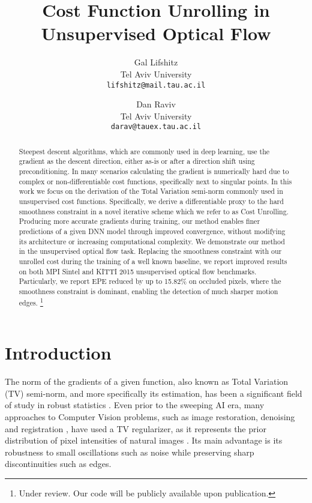 \documentclass[10pt,twocolumn,letterpaper]{article}
\begin{document}
\title{Cost Function Unrolling in Unsupervised Optical Flow}

\author{Gal Lifshitz\\
Tel Aviv University\\
{\tt\small lifshitz@mail.tau.ac.il}
\and
Dan Raviv\\
Tel Aviv University\\
{\tt\small darav@tauex.tau.ac.il}
}
\maketitle

\begin{abstract}

Steepest descent algorithms, which are commonly used in deep learning, use the gradient as the descent direction, either as-is or after a direction shift using preconditioning. 
In many scenarios calculating the gradient is numerically hard due to complex or non-differentiable cost functions, specifically next to singular points. 
In this work we focus on the derivation of the Total Variation semi-norm commonly used in unsupervised cost functions.
Specifically, we derive a differentiable proxy to the hard  smoothness constraint in a novel iterative scheme which we refer to as Cost Unrolling.
Producing more accurate gradients during training, our method enables finer predictions of a given DNN model through improved convergence, without modifying its architecture or increasing computational complexity.
We demonstrate our method in the unsupervised optical flow task. Replacing the  smoothness constraint with our unrolled cost during the training of a well known baseline, we report improved results on both MPI Sintel and KITTI 2015 unsupervised optical flow benchmarks.
Particularly, we report EPE reduced by up to 15.82\% on occluded pixels, where the smoothness constraint is dominant, enabling the detection of much sharper motion edges.
\footnote{Under review. Our code will be publicly available upon publication.}






\end{abstract}

 \section{Introduction}

The  norm of the gradients of a given function, also known as Total Variation (TV) semi-norm, and more specifically its estimation, has been a significant field of study in robust statistics \cite{Huber.Wiley.ea1981Robuststatistics}. Even prior to the sweeping AI era, many approaches to Computer Vision problems, such as image restoration, denoising and registration \cite{RUDIN1992259,doi:10.1080/00207160500069904,zach2007duality}, have used a TV regularizer, as it represents the prior distribution of pixel intensities of natural images \cite{786990}. Its main  advantage is its robustness to small oscillations such as noise while preserving sharp discontinuities such as edges.
\end{document}
